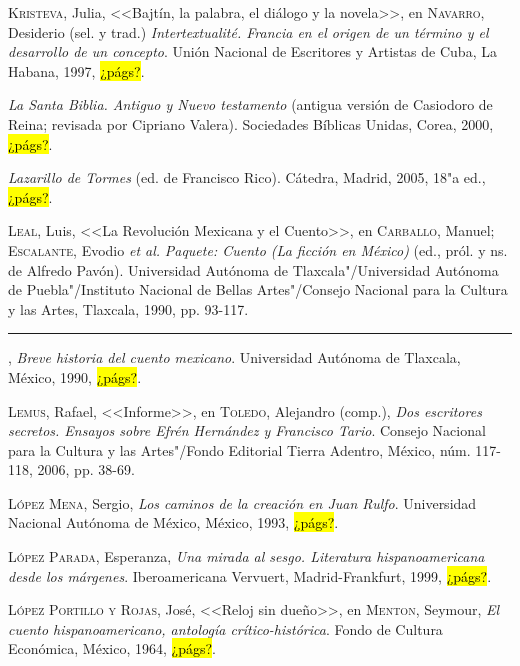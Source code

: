 \documentclass[14pt,twoside,final]{extbook} %
\begin{document}
\textsc{Kristeva}, Julia, <<Bajtín, la palabra, el diálogo y la novela>>, en \textsc{Navarro}, Desiderio (sel. y trad.) \emph{Intertextualité. Francia en el origen de un término y el desarrollo de un concepto}. Unión Nacional de Escritores y Artistas de Cuba, La Habana, 1997, \hl{¿págs?}.\label{bib:kristeva1997}

\emph{La Santa Biblia. Antiguo y Nuevo testamento} (antigua versión de Casiodoro de Reina; revisada por Cipriano Valera). Sociedades Bíblicas Unidas, Corea, 2000, \hl{¿págs?}.\label{bib:biblia2000}

\emph{Lazarillo de Tormes} (ed. de Francisco Rico). Cátedra, Madrid, 2005, 18"a ed., \hl{¿págs?}.\label{bib:lazarillo2005}

\textsc{Leal}, Luis, <<La Revolución Mexicana y el Cuento>>, en \textsc{Carballo}, Manuel; \textsc{Escalante}, Evodio \emph{et al.} \emph{Paquete: Cuento (La ficción en México)} (ed., pról. y ns. de Alfredo Pavón). Universidad Autónoma de Tlaxcala"/Universidad Autónoma de Puebla"/Instituto Nacional de Bellas Artes"/Consejo Nacional para la Cultura y las Artes, Tlaxcala, 1990, pp. 93-117.\label{bib:leal1990a}

\rule{1cm}{0.4pt}, \emph{Breve historia del cuento mexicano}. Universidad Autónoma de Tlaxcala, México, 1990, \hl{¿págs?}.\label{bib:leal1990b}

\textsc{Lemus}, Rafael, <<Informe>>, en \textsc{Toledo}, Alejandro (comp.), \emph{Dos escritores secretos. Ensayos sobre Efrén Hernández y Francisco Tario}. Consejo Nacional para la Cultura y las Artes"/Fondo Editorial Tierra Adentro, México, núm. 117-118, 2006, pp. 38-69.\label{bib:lemus2006}

\textsc{López Mena}, Sergio, \emph{Los caminos de la creación en Juan Rulfo}. Universidad Nacional Autónoma de México, México, 1993, \hl{¿págs?}.\label{bib:lopezmena1993}

\textsc{López Parada}, Esperanza, \emph{Una mirada al sesgo. Literatura hispanoamericana desde los márgenes}. Iberoamericana Vervuert, Madrid-Frankfurt, 1999, \hl{¿págs?}.\label{bib:lopezparada1999}

\textsc{López Portillo y Rojas}, José, <<Reloj sin dueño>>, en \textsc{Menton}, Seymour, \emph{El cuento hispanoamericano, antología crítico-histórica}. Fondo de Cultura Económica, México, 1964, \hl{¿págs?}.\label{bib:lopezportillo1964}
\end{document}
